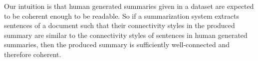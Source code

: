 Our intuition is that human generated summaries given in a dataset are expected to be coherent enough to be readable.
So if a summarization system extracts sentences of a document such that their connectivity styles in the produced summary are similar to the connectivity styles of sentences in human generated summaries, then the produced summary is sufficiently well-connected and therefore coherent. 
 



